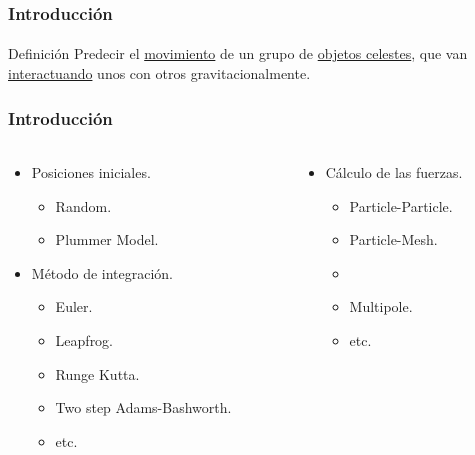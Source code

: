 \frame
{
\frametitle{Introducción}
\framesubtitle{}
\begin{block}{Definición}
    Predecir el \underline{movimiento} de un grupo de \underline{objetos celestes},
    que van \underline{interactuando} unos con otros gravitacionalmente.
\end{block}
}

\frame
{
\frametitle{Introducción}
\framesubtitle{}
\begin{columns}
    \begin{column}{0.5\textwidth}
        \begin{itemize}
            \item Posiciones iniciales.
            \begin{itemize}
                \item Random.
                \item Plummer Model.
            \end{itemize}
            \item Método de integración.
            \begin{itemize}
                \item Euler.
                \item Leapfrog.
                \item Runge Kutta.
                \item Two step Adams-Bashworth.
                \item etc.
            \end{itemize}
        \end{itemize}
    \end{column}
    \begin{column}{0.5\textwidth}
        \begin{itemize}
            \item Cálculo de las fuerzas.
            \begin{itemize}
                \item Particle-Particle. 
                \item Particle-Mesh.  
                \item {} 
                \item Multipole. 
                \item etc.
            \end{itemize}
        \end{itemize}
    \end{column}
\end{columns}
}

